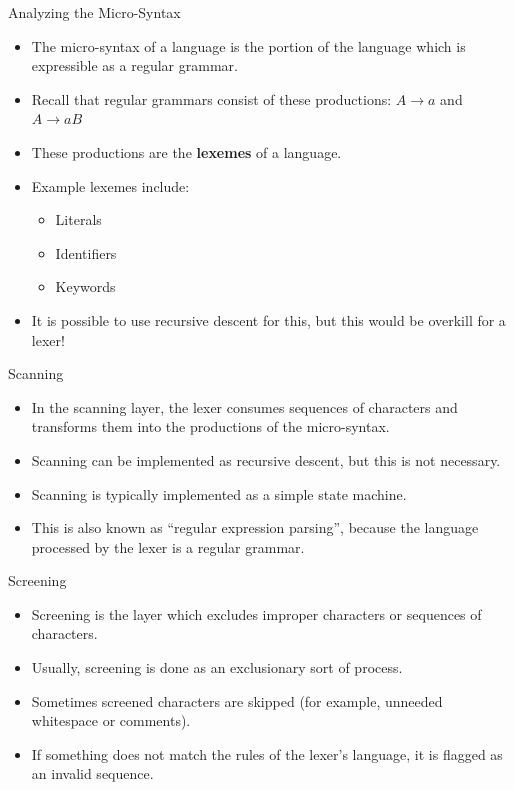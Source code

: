 \documentclass[]{beamer}
\begin{document}
\begin{frame}{Analyzing the Micro-Syntax}
    \begin{itemize}[<+->]
        \item The micro-syntax of a language is the portion of the 
            language which is expressible as a regular grammar.
        \item Recall that regular grammars consist of these productions:
            \newline$A \rightarrow a$ and $A \rightarrow aB$
        \item These productions are the \textbf{lexemes} of
            a language.
        \item Example lexemes include:
            \begin{itemize}
                \item Literals
                \item Identifiers
                \item Keywords
            \end{itemize}
        \item It is possible to use recursive descent for this, but
            this would be overkill for a lexer!
    \end{itemize}
\end{frame}

\begin{frame}{Scanning}
    \begin{itemize}[<+->]
        \item In the scanning layer, the lexer consumes sequences of
            characters and transforms them into the productions of the
            micro-syntax.
        \item Scanning can be implemented as recursive descent, but
            this is not necessary.
        \item Scanning is typically implemented as a simple state
            machine. 
        \item This is also known as ``regular expression parsing'',
            because the language processed by the lexer is a regular
            grammar.
    \end{itemize}
\end{frame}

\begin{frame}{Screening}
    \begin{itemize}[<+->]
        \item Screening is the layer which excludes improper
            characters or sequences of characters.
        \item Usually, screening is done as an exclusionary sort of
            process.
        \item Sometimes screened characters are skipped (for example,
            unneeded whitespace or comments).
        \item If something does not match the rules of the lexer's
            language, it is flagged as an invalid sequence.
    \end{itemize}
\end{frame}
\end{document}
